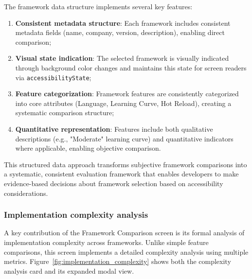The framework data structure implements several key features:

\begin{enumerate}
    \item \textbf{Consistent metadata structure}: Each framework includes consistent metadata fields (name, company, version, description), enabling direct comparison;
    
    \item \textbf{Visual state indication}: The selected framework is visually indicated through background color changes and maintains this state for screen readers via \texttt{accessibilityState};
    
    \item \textbf{Feature categorization}: Framework features are consistently categorized into core attributes (Language, Learning Curve, Hot Reload), creating a systematic comparison structure;
    
    \item \textbf{Quantitative representation}: Features include both qualitative descriptions (e.g., "Moderate" learning curve) and quantitative indicators where applicable, enabling objective comparison.
\end{enumerate}

This structured data approach transforms subjective framework comparisons into a systematic, consistent evaluation framework that enables developers to make evidence-based decisions about framework selection based on accessibility considerations.

\subsubsection{Implementation complexity analysis}

A key contribution of the Framework Comparison screen is its formal analysis of implementation complexity across frameworks. Unlike simple feature comparisons, this screen implements a detailed complexity analysis using multiple metrics. Figure~\ref{fig:implementation_complexity} shows both the complexity analysis card and its expanded modal view.

